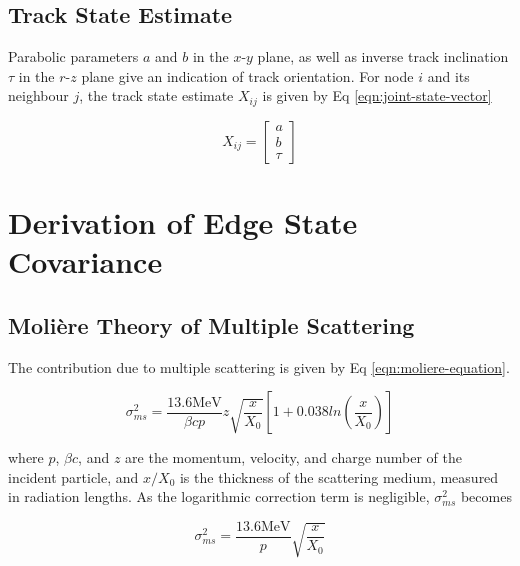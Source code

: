 \subsection{Track State Estimate}

Parabolic parameters $a$ and $b$ in the $x$-$y$ plane, as well as inverse track inclination $\tau$ in the $r$-$z$ plane give an indication of track orientation. For node $i$ and its neighbour $j$, the track state estimate $X_{ij}$ is given by Eq \eqref{eqn:joint-state-vector}

\begin{equation}
X_{ij} = \begin{bmatrix} a \\ b \\ \tau \end{bmatrix}
\label{eqn:joint-state-vector}
\end{equation}






\section{Derivation of Edge State Covariance}
\label{chapter-6-covariance-derivation}

\subsection{Moli\`ere Theory of Multiple Scattering}

The contribution due to multiple scattering is given by Eq \eqref{eqn:moliere-equation}.

\begin{equation}
    \sigma_{ms}^{2} = \frac{13.6 \text{MeV}}{\beta c p} z \sqrt{\frac{x}{X_0}} \left[ 1 + 0.038ln \left( \frac{x}{X_0} \right) \right] 
    \label{eqn:moliere-equation}
\end{equation}

where $p$, $\beta c$, and $z$ are the momentum, velocity, and charge number of the incident particle, and $x/X_0$ is the thickness of the scattering medium, measured in radiation lengths. As the logarithmic correction term is negligible, $\sigma_{ms}^{2}$ becomes

\begin{equation}
    \sigma_{ms}^{2} = \frac{13.6 \text{MeV}}{p} \sqrt{\frac{x}{X_0}}
    \label{eqn:simplified-moliere-equation}
\end{equation}

